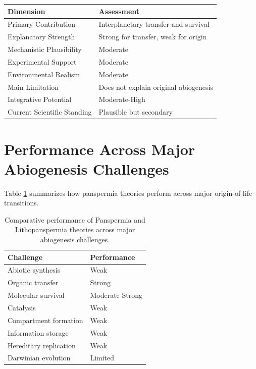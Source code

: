 \documentclass[
  oneside]{book}
\begin{document}
\begin{longtable}[]{@{}ll@{}}
\toprule\noalign{}
Dimension & Assessment \\
\midrule\noalign{}
\endhead
\bottomrule\noalign{}
\endlastfoot
Primary Contribution & Interplanetary transfer and survival \\
Explanatory Strength & Strong for transfer, weak for origin \\
Mechanistic Plausibility & Moderate \\
Experimental Support & Moderate \\
Environmental Realism & Moderate \\
Main Limitation & Does not explain original abiogenesis \\
Integrative Potential & Moderate-High \\
Current Scientific Standing & Plausible but secondary \\
\end{longtable}

\section{Performance Across Major Abiogenesis Challenges}\label{performance-across-major-abiogenesis-challenges-1}

Table \ref{tab:panspermia-performance} summarizes how panspermia theories perform across major origin-of-life transitions.

\begin{table}

\caption{\label{tab:panspermia-performance}Comparative performance of Panspermia and Lithopanspermia theories across major abiogenesis challenges.}
\centering
\begin{tabular}[t]{l|l}
\hline
Challenge & Performance\\
\hline
Abiotic synthesis & Weak\\
\hline
Organic transfer & Strong\\
\hline
Molecular survival & Moderate-Strong\\
\hline
Catalysis & Weak\\
\hline
Compartment formation & Weak\\
\hline
Information storage & Weak\\
\hline
Hereditary replication & Weak\\
\hline
Darwinian evolution & Limited\\
\hline
\end{tabular}
\end{table}
\end{document}
